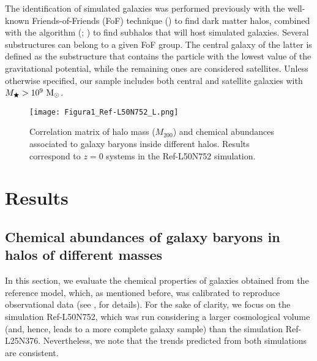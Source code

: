 \documentclass[baaa]{baaa}
\begin{document}
The identification of simulated galaxies was performed previously with the well-known {\sc Friends-of-Friends} ({\sc FoF}) technique (\citealp{Davis1985}) to find dark matter halos, combined with the {} algorithm (\citealp{Springel2005}; \citealp{Dolag2009}) to find subhalos that will host simulated galaxies. Several {} substructures can belong to a given {\sc FoF} group. The central galaxy of the latter is defined as the substructure that contains the particle with the lowest value of the gravitational potential, while the remaining ones are considered satellites. Unless otherwise specified, our sample includes both central and satellite galaxies with $M_\bigstar > 10^9~{{\rm M}_\odot}$.



\begin{figure}[!t]
\centering
\texttt{[image: Figura1\_Ref-L50N752\_L.png]}
	\caption{Correlation matrix of halo mass ($M_{200}$) and chemical abundances associated to galaxy baryons inside different halos. Results correspond to $z=0$ systems in the Ref-L50N752 simulation.}
\label{fig:matrix}
\end{figure}




\section{Results}\label{sec:results}

\subsection{Chemical abundances of galaxy baryons in halos of different masses}
In this section, we evaluate the chemical properties of galaxies obtained from the {} reference model, which, as mentioned before, was calibrated to reproduce observational data (see \citealt{schaye2015}, for details).  For the sake of clarity, we focus on the simulation Ref-L50N752, which was run considering a larger cosmological volume (and, hence, leads to a more complete galaxy sample) than the simulation Ref-L25N376.  Nevertheless, we note that the trends predicted from both simulations are consistent.
\end{document}
